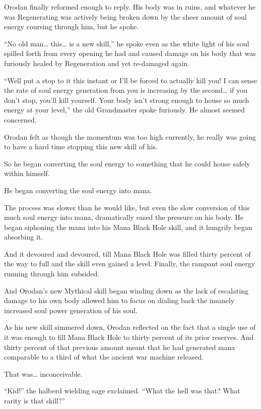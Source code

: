 \documentclass[a4paper,10pt]{book}
\begin{document}
Orodan finally reformed enough to reply. His body was in ruins, and whatever he was Regenerating was actively being broken down by the sheer amount of soul energy coursing through him, but he spoke.\par
“No old man… this… is a new skill,” he spoke even as the white light of his soul spilled forth from every opening he had and caused damage on his body that was furiously healed by Regeneration and yet re-damaged again.\par
“Well put a stop to it this instant or I’ll be forced to actually kill you! I can sense the rate of soul energy generation from you is increasing by the second… if you don’t stop, you’ll kill yourself. Your body isn’t strong enough to house so much energy at your level,” the old Grandmaster spoke furiously. He almost seemed concerned.\par
Orodan felt as though the momentum was too high currently, he really was going to have a hard time stopping this new skill of his.\par
So he began converting the soul energy to something that he could house safely within himself.\par
He began converting the soul energy into mana.\par
The process was slower than he would like, but even the slow conversion of this much soul energy into mana, dramatically eased the pressure on his body. He began siphoning the mana into his Mana Black Hole skill, and it hungrily began absorbing it.\par
And it devoured and devoured, till Mana Black Hole was filled thirty percent of the way to full and the skill even gained a level. Finally, the rampant soul energy running through him subsided.\par
And Orodan’s new Mythical skill began winding down as the lack of escalating damage to his own body allowed him to focus on dialing back the insanely increased soul power generation of his soul.\par
As his new skill simmered down, Orodan reflected on the fact that a single use of it was enough to fill Mana Black Hole to thirty percent of its prior reserves. And thirty percent of that previous amount meant that he had generated mana comparable to a third of what the ancient war machine released.\par
That was… inconceivable.\par
“Kid!” the halberd wielding sage exclaimed. “What the hell was that? What rarity is that skill?”\par
\end{document}
